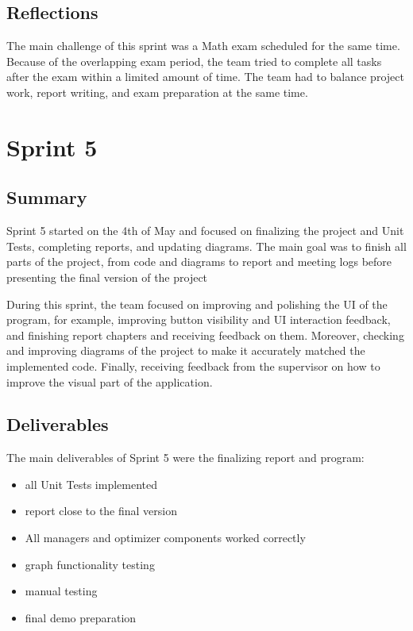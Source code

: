 \subsection*{Reflections}

The main challenge of this sprint was a Math exam scheduled for the same time. Because of the overlapping exam period, the team tried to complete all tasks after the exam within a limited amount of time. The team had to balance project work, report writing, and exam preparation at the same time.


\section{Sprint 5}

 

\subsection*{Summary}

Sprint 5 started on the 4th of May and focused on finalizing the project and Unit Tests, completing reports, and updating diagrams. The main goal was to finish all parts of the project, from code and diagrams to report and meeting logs before presenting the final version of the project

During this sprint, the team focused on improving and polishing the UI of the program, for example, improving button visibility and UI interaction feedback, and finishing report chapters and receiving feedback on them. Moreover, checking and improving diagrams of the project to make it accurately matched the implemented code. Finally, receiving feedback from the supervisor on how to improve the visual part of the application.

\subsection*{Deliverables}

The main deliverables of Sprint 5 were the finalizing report and program: 

\begin{itemize}
    \item  all Unit Tests implemented
    
    \item report close to the final version

    \item  All managers and optimizer components worked correctly

    \item  graph functionality testing

    \item  manual testing

    \item final demo preparation

\end{itemize}


